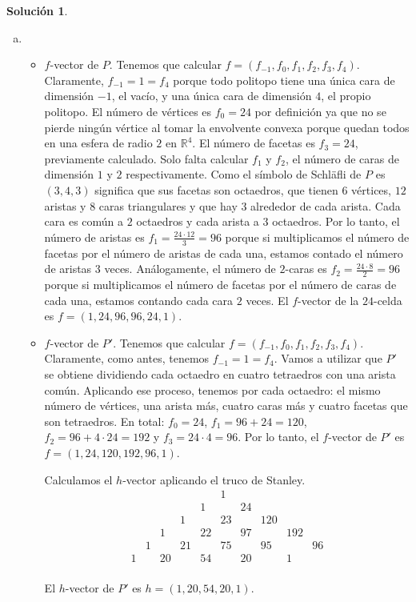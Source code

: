\documentclass[10pt]{article}
\theoremstyle{definition}
\newtheorem*{sol}{Solución}
\begin{document}
\begin{sol}
\begin{enumerate}[(a)]
    \item \begin{itemize}
    \item $f$-vector de $P$. Tenemos que calcular $f=(f_{-1},f_0,f_1,f_2,f_3,f_4)$. Claramente, $f_{-1}=1=f_4$ porque todo politopo tiene una única cara de dimensión $-1$, el vacío, y una única cara de dimensión $4$, el propio politopo. El número de vértices es $f_0=24$ por definición ya que no se pierde ningún vértice al tomar la envolvente convexa porque quedan todos en una esfera de radio $2$ en $\mathbb{R}^4$. El número de facetas es $f_{3}=24$, previamente calculado. Solo falta calcular $f_1$ y $f_2$, el número de caras de dimensión $1$ y $2$ respectivamente. Como el símbolo de Schläfli de $P$ es $(3,4,3)$ significa que sus facetas son octaedros, que tienen $6$ vértices, $12$ aristas y $8$ caras triangulares y que hay $3$ alrededor de cada arista. Cada cara es común a $2$ octaedros y cada arista a $3$ octaedros. Por lo tanto, el número de aristas es $f_1=\frac{24\cdot 12}{3}=96$ porque si multiplicamos el número de facetas por el número de aristas de cada una, estamos contado el número de aristas $3$ veces. Análogamente, el número de $2$-caras es $f_2=\frac{24\cdot 8}{2}=96$ porque si multiplicamos el número de facetas por el número de caras de cada una, estamos contando cada cara $2$ veces. El $f$-vector de la $24$-celda es $f=(1,24,96,96,24,1)$.
        \item $f$-vector de $P'$. Tenemos que calcular $f=(f_{-1},f_0,f_1,f_2,f_3,f_4)$. Claramente, como antes, tenemos  $f_{-1}=1=f_4$. Vamos a utilizar que  $P'$ se obtiene dividiendo cada octaedro en cuatro tetraedros con una arista común. Aplicando ese proceso, tenemos por cada octaedro: el mismo número de vértices, una arista más, cuatro caras más y cuatro facetas que son tetraedros. En total: $f_0=24$, $f_1=96+24=120$, $f_2=96+4\cdot 24=192$ y $f_3=24\cdot 4=96$. Por lo tanto, el $f$-vector de $P'$ es $f=(1,24,120,192,96,1)$.
        
        Calculamos el $h$-vector aplicando el truco de Stanley.
        \[\begin{array}{cccccccccccccc}
        &&&&&&&1&&&&&&\\
        &&&&&&1&&24&&&&&\\
        &&&&&1&&23&&120&&&&\\
        &&&&1&&22&&97&&192&&&\\
        &&&1&&21&&75&&95&&96&&\\
        &&1&&20&&54&&20&&1&&&\\
        \end{array}\]
        
        El $h$-vector de $P'$ es $h=(1,20,54,20,1)$.
    \end{itemize}
    \end{enumerate}
\end{sol}
\end{document}
